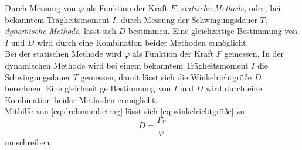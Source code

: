 Durch Messung von $\varphi$ als Funktion der Kraft $F$, \textit{statische Methode}, oder, bei bekanntem Trägheitsmoment $I$, durch Messung der Schwingungsdauer $T$, \textit{dynamische Methode}, lässt sich
$D$ bestimmen. Eine gleichzeitige Bestimmung von $I$ und $D$ wird durch eine Kombination beider Methoden ermöglicht. \\

Bei der statischen Methode wird $\varphi$ als Funktion der Kraft $F$ gemessen. In der dynamischen Methode wird bei einem bekanntem Trägheitsmoment $I$ die Schwingungsdauer $T$ gemessen, damit lässt sich die Winkelrichtgröße $D$ berechnen.
Eine gleichzeitige Bestimmung von $I$ und $D$ wird durch eine Kombination beider Methoden ermöglicht.\\

Mithilfe von \eqref{eq:drehmombetrag} lässt sich \eqref{eq:winkelrichtgröße} zu
\begin{equation}
  D = \frac{F r}{\varphi}
  \label{eq:WinkelrichtgröFr}
\end{equation}
umschreiben. 

